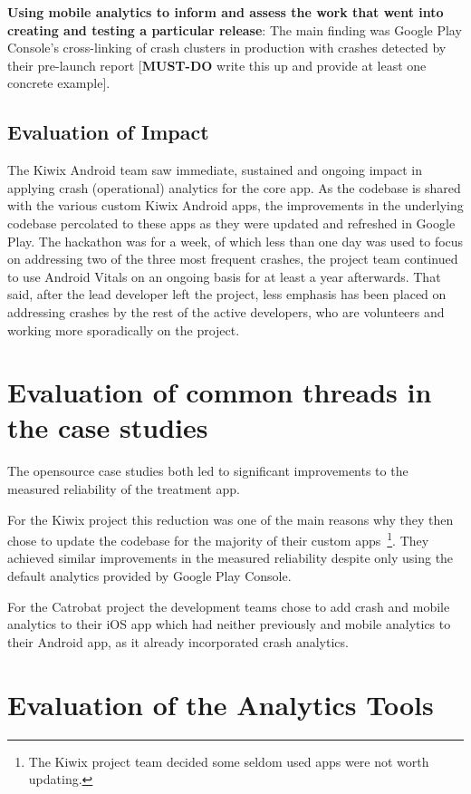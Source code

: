 \textbf{Using mobile analytics to inform and assess the work that went into creating and testing a particular release}: The main finding was Google Play Console's cross-linking of crash clusters in production with crashes detected by their pre-launch report [\textbf{MUST-DO} write this up and provide at least one concrete example]. 



\subsection{Evaluation of Impact}
The Kiwix Android team saw immediate, sustained and ongoing impact in applying crash (operational) analytics for the core app. As the codebase is shared with the various custom Kiwix Android apps, the improvements in the underlying codebase percolated to these apps as they were updated and refreshed in Google Play. The hackathon was for a week, of which less than one day was used to focus on addressing two of the three most frequent crashes, the project team continued to use Android Vitals on an ongoing basis for at least a year afterwards. That said, after the lead developer left the project, less emphasis has been placed on addressing crashes by the rest of the active developers, who are volunteers and working more sporadically on the project.


\newpage
\section{Evaluation of common threads in the case studies}
The opensource case studies both led to significant improvements to the measured reliability of the treatment app. 

For the Kiwix project this reduction was one of the main reasons why they then chose to update the codebase for the majority of their custom apps~\footnote{The Kiwix project team decided some seldom used apps were not worth updating.}. They achieved similar improvements in the measured reliability despite only using the default analytics provided by Google Play Console. 

For the Catrobat project the development teams chose to add crash and mobile analytics to their iOS app which had neither previously and mobile analytics to their Android app, as it already incorporated crash analytics.



\section{Evaluation of the Analytics Tools}

